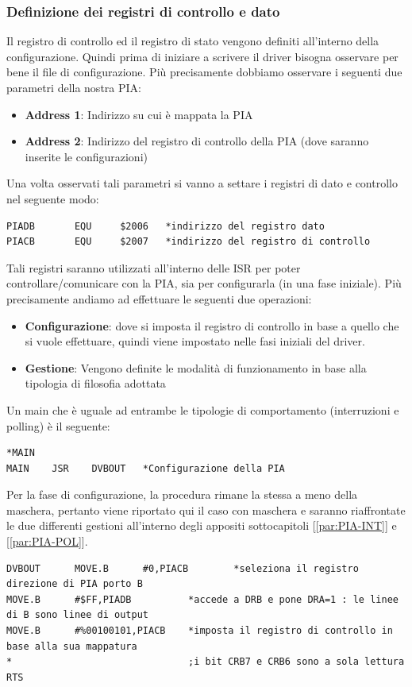\subsubsection{Definizione dei registri di controllo e dato}\label{par:cnt-stt}
Il registro di controllo ed il registro di stato vengono definiti all'interno della configurazione. Quindi prima di iniziare a scrivere il driver bisogna osservare per bene il file di configurazione. Più precisamente dobbiamo osservare i seguenti due parametri della nostra PIA:
\begin{itemize}
    \item \textbf{Address 1}: Indirizzo su cui è mappata la PIA
    \item \textbf{Address 2}: Indirizzo del registro di controllo della PIA (dove saranno inserite le configurazioni)
\end{itemize}

Una volta osservati tali parametri si vanno a settare i registri di dato e controllo nel seguente modo:
\begin{lstlisting}
PIADB       EQU     $2006	*indirizzo del registro dato 
PIACB       EQU     $2007	*indirizzo del registro di controllo
\end{lstlisting}

Tali registri saranno utilizzati all'interno delle ISR per poter controllare/comunicare con la PIA, sia per configurarla (in una fase iniziale). Più precisamente andiamo ad effettuare le seguenti due operazioni:
\begin{itemize}
    \item \textbf{Configurazione}: dove si imposta il registro di controllo in base a quello che si vuole effettuare, quindi viene impostato nelle fasi iniziali del driver.
    \item \textbf{Gestione}: Vengono definite le modalità di funzionamento in base alla tipologia di filosofia adottata
\end{itemize}

Un main che è uguale ad entrambe le tipologie di comportamento (interruzioni e polling) è il seguente:
\begin{lstlisting}
*MAIN
MAIN	JSR    DVBOUT	*Configurazione della PIA
\end{lstlisting}

Per la fase di configurazione, la procedura rimane la stessa a meno della maschera, pertanto viene riportato qui il caso con maschera e saranno riaffrontate le due differenti gestioni all'interno degli appositi sottocapitoli [\ref{par:PIA-INT}] e [\ref{par:PIA-POL}].
\begin{lstlisting}
DVBOUT      MOVE.B      #0,PIACB		*seleziona il registro direzione di PIA porto B 
MOVE.B      #$FF,PIADB	  		*accede a DRB e pone DRA=1 : le linee di B sono linee di output	
MOVE.B      #%00100101,PIACB   	*imposta il registro di controllo in base alla sua mappatura
*								;i bit CRB7 e CRB6 sono a sola lettura	
RTS
\end{lstlisting}

